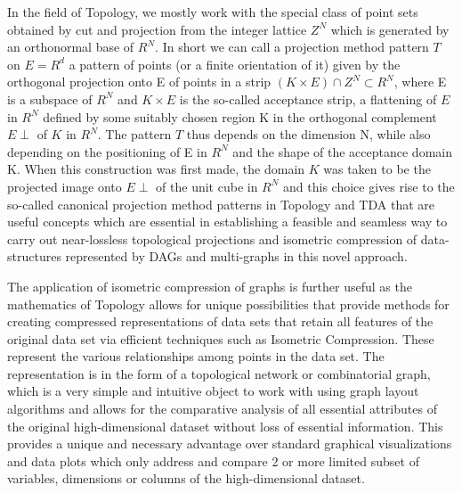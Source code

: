 In the field of Topology, we mostly work with the special class of point sets obtained by cut and projection from the integer lattice $Z^{N}$ which is generated by an orthonormal base of $R^{N}$. In short we can call a projection method pattern $T$ on $E = R^{d}$ a pattern of points (or a finite orientation of it) given by the orthogonal projection onto E of points in a strip $(K × E) \cap Z^{N} \subset R^{N}$, where E is a subspace of $R^{N}$ and $K × E$ is the so-called acceptance strip, a flattening of $E$ in $R^{N}$ defined by some suitably chosen region K in the orthogonal complement $E \perp$ of $K$ in $R^{N}$. The pattern $T$ thus depends on the dimension N, while also depending on the positioning of E in $R^{N}$ and the shape of the acceptance domain K. When this construction was first made, the domain $K$ was taken to be the projected image onto $E \perp$ of the unit cube in $R^{N}$ and this choice gives rise to the so-called canonical projection method patterns in Topology and TDA that are useful concepts which are essential in establishing a feasible and seamless way to carry out near-lossless topological projections and isometric compression of data-structures represented by DAGs and multi-graphs in this novel approach.\cite{12.0_alatorre2018TDAinvariant} \cite{12.1_2002topologicalInvariaceProjection}

The application of isometric compression of graphs \cite{03.5_kramar2013persistenceComputing} \cite{12.2_compressingTopoNetworkGraphs} is further useful as the mathematics of Topology allows for unique possibilities that provide methods for creating compressed representations of data sets that retain all features of the original data set via efficient techniques such as Isometric Compression. These represent the various relationships among points in the data set. The representation is in the form of a topological network or combinatorial graph, which is a very simple and intuitive object to work with using graph layout algorithms and allows for the comparative analysis of all essential attributes of the original high-dimensional dataset without loss of essential information. This provides a unique and necessary advantage over standard graphical visualizations and data plots which only address and compare 2 or more limited subset of variables, dimensions or columns of the high-dimensional dataset.\cite{21.0_2016TopoCompression}

